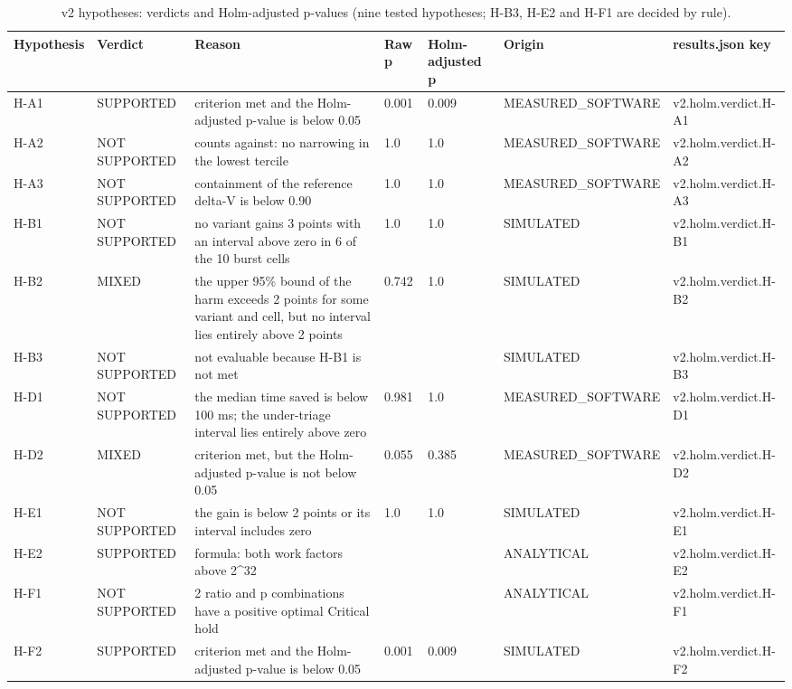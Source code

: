 \begin{table}[t]
\centering
\small
\caption{v2 hypotheses: verdicts and Holm-adjusted p-values (nine tested hypotheses; H-B3, H-E2 and H-F1 are decided by rule).}
\label{tab:v2_tab_verdicts}
\begin{tabular}{lllllll}
\toprule
Hypothesis & Verdict & Reason & Raw p & Holm-adjusted p & Origin & results.json key \\
\midrule
H-A1 & SUPPORTED & criterion met and the Holm-adjusted p-value is below 0.05 & 0.001 & 0.009 & MEASURED\_SOFTWARE & v2.holm.verdict.H-A1 \\
H-A2 & NOT SUPPORTED & counts against: no narrowing in the lowest tercile & 1.0 & 1.0 & MEASURED\_SOFTWARE & v2.holm.verdict.H-A2 \\
H-A3 & NOT SUPPORTED & containment of the reference delta-V is below 0.90 & 1.0 & 1.0 & MEASURED\_SOFTWARE & v2.holm.verdict.H-A3 \\
H-B1 & NOT SUPPORTED & no variant gains 3 points with an interval above zero in 6 of the 10 burst cells & 1.0 & 1.0 & SIMULATED & v2.holm.verdict.H-B1 \\
H-B2 & MIXED & the upper 95\% bound of the harm exceeds 2 points for some variant and cell, but no interval lies entirely above 2 points & 0.742 & 1.0 & SIMULATED & v2.holm.verdict.H-B2 \\
H-B3 & NOT SUPPORTED & not evaluable because H-B1 is not met &  &  & SIMULATED & v2.holm.verdict.H-B3 \\
H-D1 & NOT SUPPORTED & the median time saved is below 100 ms; the under-triage interval lies entirely above zero & 0.981 & 1.0 & MEASURED\_SOFTWARE & v2.holm.verdict.H-D1 \\
H-D2 & MIXED & criterion met, but the Holm-adjusted p-value is not below 0.05 & 0.055 & 0.385 & MEASURED\_SOFTWARE & v2.holm.verdict.H-D2 \\
H-E1 & NOT SUPPORTED & the gain is below 2 points or its interval includes zero & 1.0 & 1.0 & SIMULATED & v2.holm.verdict.H-E1 \\
H-E2 & SUPPORTED & formula: both work factors above 2^32 &  &  & ANALYTICAL & v2.holm.verdict.H-E2 \\
H-F1 & NOT SUPPORTED & 2 ratio and p combinations have a positive optimal Critical hold &  &  & ANALYTICAL & v2.holm.verdict.H-F1 \\
H-F2 & SUPPORTED & criterion met and the Holm-adjusted p-value is below 0.05 & 0.001 & 0.009 & SIMULATED & v2.holm.verdict.H-F2 \\
\bottomrule
\end{tabular}
\end{table}
